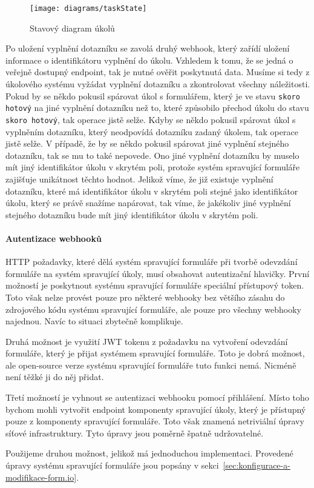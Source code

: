 \begin{figure}[H]
    \centering
    \texttt{[image: diagrams/taskState]}
    \caption{Stavový diagram úkolů}\label{fig:task-state}
\end{figure}

Po uložení vyplnění dotazníku se zavolá druhý webhook, který zařídí uložení informace o identifikátoru vyplnění do úkolu.
Vzhledem k tomu, že se jedná o veřejně dostupný endpoint, tak je nutné ověřit poskytnutá data.
Musíme si tedy z úkolového systému vyžádat vyplnění dotazníku a zkontrolovat všechny náležitosti.
Pokud by se někdo pokusil spárovat úkol s formulářem, který je ve stavu \texttt{skoro hotový} na jiné vyplnění dotazníku než to, které způsobilo přechod úkolu do stavu \texttt{skoro hotový}, tak operace jistě selže.
Kdyby se někdo pokusil spárovat úkol s vyplněním dotazníku, který neodpovídá dotazníku zadaný úkolem, tak operace jistě selže.
V případě, že by se někdo pokusil spárovat jiné vyplnění stejného dotazníku, tak se mu to také nepovede.
Ono jiné vyplnění dotazníku by muselo mít jiný identifikátor úkolu v skrytém poli, protože systém spravující formuláře zajišťuje unikátnost těchto hodnot.
Jelikož víme, že již existuje vyplnění dotazníku, které má identifikátor úkolu v skrytém poli stejné jako identifikátor úkolu, který se právě snažíme napárovat, tak víme, že jakékoliv jiné vyplnění stejného dotazníku bude mít jiný identifikátor úkolu v skrytém poli.

\paragraph{Autentizace webhooků}

HTTP požadavky, které dělá systém spravující formuláře při tvorbě odevzdání formuláře na systém spravující úkoly, musí obsahovat autentizační hlavičky.
První možností je poskytnout systému spravující formuláře speciální přístupový token.
Toto však nelze provést pouze pro některé webhooky bez většího zásahu do zdrojového kódu systému spravující formuláře, ale pouze pro všechny webhooky najednou.
Navíc to situaci zbytečně komplikuje.

Druhá možnost je využití JWT tokenu z požadavku na vytvoření odevzdání formuláře, který je přijat systémem spravující formuláře.
Toto je dobrá možnost, ale open-source verze systému spravující formuláře tuto funkci nemá.
Nicméně není těžké ji do něj přidat.

Třetí možností je vyhnout se autentizaci webhooku pomocí přihlášení.
Místo toho bychom mohli vytvořit endpoint komponenty spravující úkoly, který je přístupný pouze z komponenty spravující formuláře.
Toto však znamená netriviální úpravy síťové infrastruktury.
Tyto úpravy jsou poměrně špatně udržovatelné.

Použijeme druhou možnost, jelikož má jednoduchou implementaci.
Provedené úpravy systému spravující formuláře jsou popsány v sekci~\ref{sec:konfigurace-a-modifikace-form.io}.

